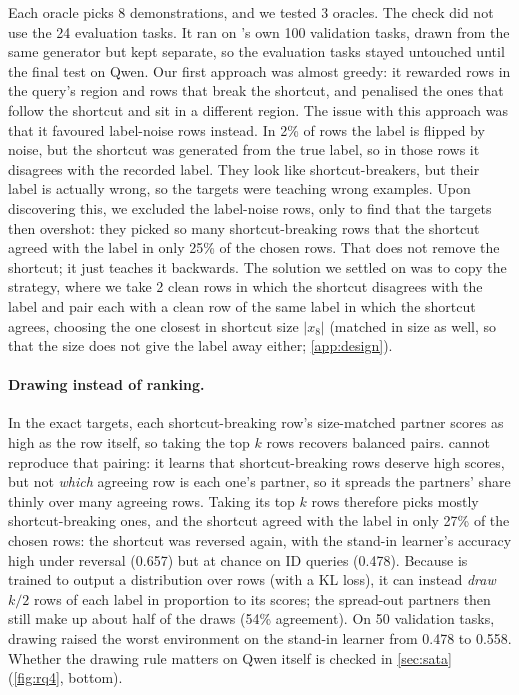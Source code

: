 Each oracle picks 8 demonstrations, and we tested 3 oracles. The check did not use the 24 evaluation tasks. It ran on \sata's own 100 validation tasks, drawn from the same generator but kept separate, so the evaluation tasks stayed untouched until the final test on Qwen. Our first approach was almost greedy: it rewarded rows in the query's region and rows that break the shortcut, and penalised the ones that follow the shortcut and sit in a different region. The issue with this approach was that it favoured label-noise rows instead. In 2\% of rows the label is flipped by noise, but the shortcut was generated from the true label, so in those rows it disagrees with the recorded label. They look like shortcut-breakers, but their label is actually wrong, so the targets were teaching wrong examples. Upon discovering this, we excluded the label-noise rows, only to find that the targets then overshot: they picked so many shortcut-breaking rows that the shortcut agreed with the label in only 25\% of the chosen rows. That does not remove the shortcut; it just teaches it backwards. The solution we settled on was to copy the  strategy, where we take 2 clean rows in which the shortcut disagrees with the label and pair each with a clean row of the same label in which the shortcut agrees, choosing the one closest in shortcut size $|x_8|$ (matched in size as well, so that the size does not give the label away either; \autoref{app:design}).

\paragraph{Drawing instead of ranking.}
In the exact targets, each shortcut-breaking row's size-matched partner scores as high as the row itself, so taking the top $k$ rows recovers balanced pairs. \sata cannot reproduce that pairing: it learns that shortcut-breaking rows deserve high scores, but not \emph{which} agreeing row is each one's partner, so it spreads the partners' share thinly over many agreeing rows. Taking its top $k$ rows therefore picks mostly shortcut-breaking ones, and the shortcut agreed with the label in only 27\% of the chosen rows: the shortcut was reversed again, with the stand-in learner's accuracy high under reversal (0.657) but at chance on ID queries (0.478). Because \sata is trained to output a distribution over rows (with a KL loss), it can instead \emph{draw} $k/2$ rows of each label in proportion to its scores; the spread-out partners then still make up about half of the draws (54\% agreement). On 50 validation tasks, drawing raised the worst environment on the stand-in learner from 0.478 to 0.558. Whether the drawing rule matters on Qwen itself is checked in \autoref{sec:sata} (\autoref{fig:rq4}, bottom).

